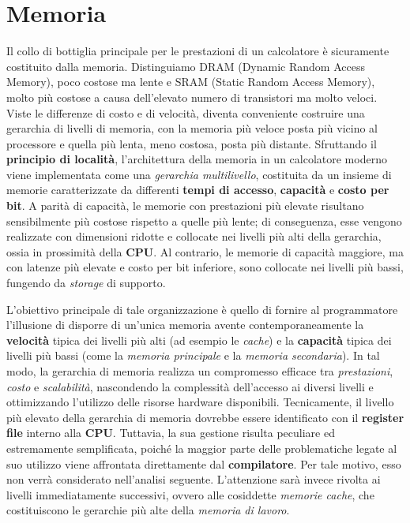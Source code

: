 \sloppy \section{Memoria}
Il collo di bottiglia principale per le prestazioni di un calcolatore è sicuramente costituito dalla memoria. Distinguiamo DRAM (Dynamic Random  Access Memory), poco costose ma lente e SRAM (Static Random Access Memory), molto più costose a causa dell'elevato numero di transistori ma molto veloci. Viste le differenze di costo e di velocità, diventa conveniente costruire una gerarchia di livelli di memoria, con la memoria più veloce posta più vicino al processore e quella più lenta, meno costosa, posta più distante.
Sfruttando il \textbf{principio di località}, l’architettura della memoria in un calcolatore moderno viene implementata come una \textit{gerarchia multilivello}, costituita da un insieme di memorie caratterizzate da differenti \textbf{tempi di accesso}, \textbf{capacità} e \textbf{costo per bit}. A parità di capacità, le memorie con prestazioni più elevate risultano sensibilmente più costose rispetto a quelle più lente; di conseguenza, esse vengono realizzate con dimensioni ridotte e collocate nei livelli più alti della gerarchia, ossia in prossimità della \textbf{CPU}. Al contrario, le memorie di capacità maggiore, ma con latenze più elevate e costo per bit inferiore, sono collocate nei livelli più bassi, fungendo da \textit{storage} di supporto.  

L'obiettivo principale di tale organizzazione è quello di fornire al programmatore l'illusione di disporre di un’unica memoria avente contemporaneamente la \textbf{velocità} tipica dei livelli più alti (ad esempio le \textit{cache}) e la \textbf{capacità} tipica dei livelli più bassi (come la \textit{memoria principale} e la \textit{memoria secondaria}). In tal modo, la gerarchia di memoria realizza un compromesso efficace tra \textit{prestazioni}, \textit{costo} e \textit{scalabilità}, nascondendo la complessità dell’accesso ai diversi livelli e ottimizzando l’utilizzo delle risorse hardware disponibili.
Tecnicamente, il livello più elevato della gerarchia di memoria dovrebbe essere identificato con il \textbf{register file} interno alla \textbf{CPU}. Tuttavia, la sua gestione risulta peculiare ed estremamente semplificata, poiché la maggior parte delle problematiche legate al suo utilizzo viene affrontata direttamente dal \textbf{compilatore}. Per tale motivo, esso non verrà considerato nell'analisi seguente. L'attenzione sarà invece rivolta ai livelli immediatamente successivi, ovvero alle cosiddette \textit{memorie cache}, che costituiscono le gerarchie più alte della \textit{memoria di lavoro}.  

